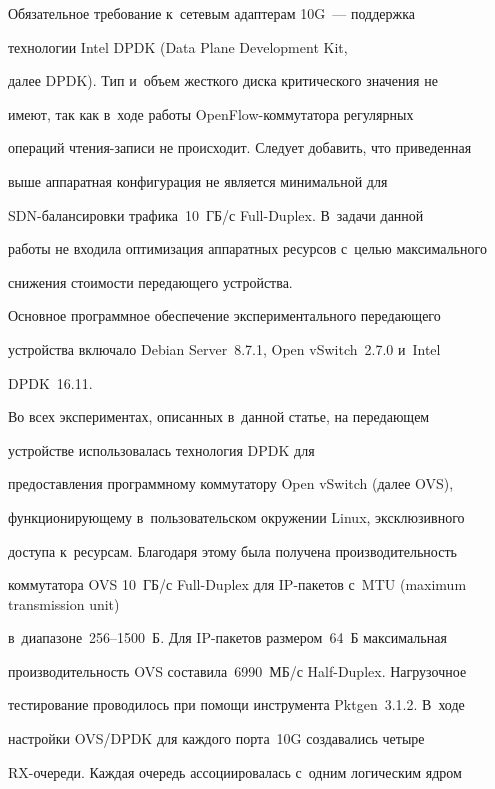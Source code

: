   


  Обязательное требование к~сетевым адаптерам 10G~--- поддержка 


технологии Intel DPDK (Data Plane Development Kit,


далее DPDK). Тип и~объем жесткого диска критического значения не 


имеют, так как в~ходе работы OpenFlow-ком\-му\-та\-то\-ра регулярных 


операций чтения-записи не происходит. Следует добавить, что приведенная 


выше аппаратная конфигурация не является минимальной для  


SDN-ба\-лан\-си\-ров\-ки трафика~10~ГБ\!/\!с Full-Duplex. В~задачи данной 


работы не входила оптимизация аппаратных ресурсов с~целью максимального 


снижения стоимости передающего устройства.


  


  Основное программное обеспечение экспериментального передающего 


устройства включало Debian Server~8.7.1, Open vSwitch~2.7.0 и~Intel 


DPDK~16.11.


  


  Во всех экспериментах, описанных в~данной статье, на передающем 


устройстве использовалась технология  DPDK для 


предоставления программному коммутатору Open vSwitch (далее OVS), 


функционирующему в~пользовательском окружении Linux, эксклюзивного 


доступа к~ресурсам. Благодаря этому была получена производительность 


коммутатора OVS 10~ГБ\!/\!с Full-Duplex для IP-па\-ке\-тов с~MTU (maximum transmission unit)


в~диапазоне~256--1500~Б. Для IP-па\-ке\-тов размером~64~Б максимальная 


производительность OVS составила~6990~МБ\!/\!с Half-Duplex. Нагрузочное 


тестирование проводилось при помощи инструмента Pktgen~3.1.2. В~ходе 


настройки OVS\!/\!DPDK для каждого порта~10G создавались четыре  


RX-оче\-ре\-ди. Каждая очередь ассоциировалась с~одним логическим ядром 


